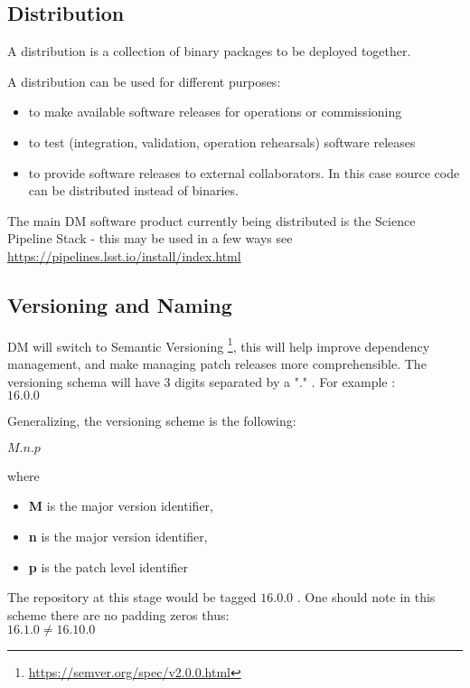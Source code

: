 \subsection{Distribution} \label{sec:distribution}

A distribution is a collection of binary packages to be deployed together.

A distribution can be used for different purposes:

\begin{itemize}
\item to make available software releases for operations or commissioning
\item to test (integration, validation, operation rehearsals) software releases
\item to provide software releases to external collaborators. In this case source code can be distributed instead of binaries.
\end{itemize}

The main DM software product currently being distributed is the Science Pipeline Stack -
this may be used in a few ways see \url{https://pipelines.lsst.io/install/index.html}


\newpage
\subsection{Versioning and Naming} \label{sec:versioning}
DM will  switch to Semantic Versioning \footnote{\url{https://semver.org/spec/v2.0.0.html}},  this will help improve dependency management, and make  managing patch releases more comprehensible.
The versioning schema will have 3 digits separated by a "." . For example :
\\
$16.0.0$

Generalizing, the versioning scheme is the following:

$M.n.p$

where 

\begin{itemize}
\item {\bf M} is the major version identifier,
\item {\bf n} is the major version identifier,
\item {\bf p} is the patch level identifier
\end{itemize}

The repository at this stage would be tagged $16.0.0$ .
One should note in this scheme there are no padding zeros thus:
\\
$16.1.0   \neq 16.10.0$

